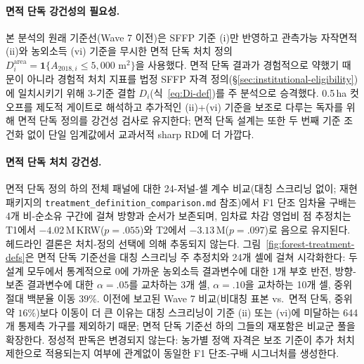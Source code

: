 \documentclass[12pt, a4paper]{article}
\begin{document}


\paragraph{면적 단독 강건성의 필요성.}\label{sec:robustness-areaonly} 본 분석의 원래 기준선(Wave 7 이전)은 SFFP 기준 (i)만 반영하고 관측가능 자작면적 (ii)와 농외소득 (vi) 기준을 무시한 면적 단독 처치 정의 $D^{\text{area}}_i = \mathbf{1}\{A_{2018,i} \le 5{,}000 \text{ m}^2\}$을 사용했다. 면적 단독 결과가 경험적으로 약했기 때문이 아니라 경험적 처치 지표를 법정 SFFP 자격 정의(\S\ref{sec:institutional-eligibility})에 일치시키기 위해 3-기준 결합 $D_i$(식~\ref{eq:Di-def})를 주 분석으로 승격했다. 0.5\,ha 컷오프를 제도적 게이트로 해석하고 추가적인 (ii)+(vi) 기준을 보조로 다루는 독자를 위해 면적 단독 정의를 강건성 검사로 유지한다; 면적 단독 설계는 또한 두 번째 기준 조건화 없이 단일 임계값에서 교과서적 sharp RD에 더 가깝다.

\paragraph{면적 단독 처치 강건성.} 면적 단독 정의 하의 전체 패널에 대한 24-저널-셀 계수 비교(대칭 스크리닝 없이; 재현 패키지의 \texttt{treatment\_definition\_comparison.md} 참조)에서 F1 단조 임차율 구배는 4개 비-순소유 구간에 걸쳐 방향과 순서가 보존되며, 임차료 차감 영업비 점 추정치는 T1에서 $-4.02$\,M\,KRW($p = .055$)와 T2에서 $-3.13$\,M($p = .097$)로 음으로 유지된다. 헤드라인 결론은 처치-정의 선택에 의해 추동되지 않는다. 그림~\ref{fig:forest-treatment-defs}은 면적 단독 기준선을 대칭 스크리닝 주 추정치와 24개 셀에 걸쳐 시각화한다: 두 설계 모두에서 통계적으로 0에 가까운 농외소득 결과변수에 대한 1개 부호 반전, 방향-보존 결과변수에 대한 $\alpha = .05$를 교차하는 3개 셀, $\alpha = .10$을 교차하는 10개 셀, 중위 절대 백분율 이동 $39\%$. 이전에 보고된 Wave 7 비교(비대칭 표본 vs.\ 면적 단독, 중위 약 $16\%$)보다 이동이 더 큰 이유는 대칭 스크리닝이 기준 (ii) 또는 (vi)에 미달하는 644개 통제측 가구를 제외하기 때문; 면적 단독 기준선 하의 그들의 재포함은 비교군 풀을 확장한다. 정성적 판독은 변경되지 않는다: 농가별 정액 자격은 보조 기준이 추가 처치 제한으로 적용되는지 여부에 관계없이 동일한 F1 단조-구배 시그너처를 생성한다.
\end{document}
